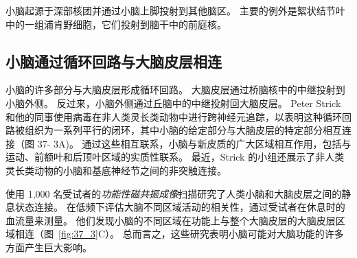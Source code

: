 小脑起源于深部核团并通过小脑上脚投射到其他脑区。
主要的例外是絮状结节叶中的一组浦肯野细胞，它们投射到脑干中的前庭核。



\subsection{小脑通过循环回路与大脑皮层相连}

小脑的许多部分与大脑皮层形成循环回路。
大脑皮层通过桥脑核中的中继投射到小脑外侧。
反过来，小脑外侧通过丘脑中的中继投射回大脑皮层。
Peter Strick 和他的同事使用病毒在非人类灵长类动物中进行跨神经元追踪，以表明这种循环回路被组织为一系列平行的闭环，其中小脑的给定部分与大脑皮层的特定部分相互连接（图 37- 3A)。
通过这些相互联系，小脑与新皮质的广大区域相互作用，包括与运动、前额叶和后顶叶区域的实质性联系。
最近，Strick 的小组还展示了非人类灵长类动物的小脑和基底神经节之间的非突触连接。


使用 1,000 名受试者的\textit{功能性磁共振成像}扫描研究了人类小脑和大脑皮层之间的静息状态连接。
在低频下评估大脑不同区域活动的相关性，通过受试者在休息时的血流量来测量。
他们发现小脑的不同区域在功能上与整个大脑皮层的大脑皮层区域相连（图~\ref{fig:37_3}C）。
总而言之，这些研究表明小脑可能对大脑功能的许多方面产生巨大影响。


